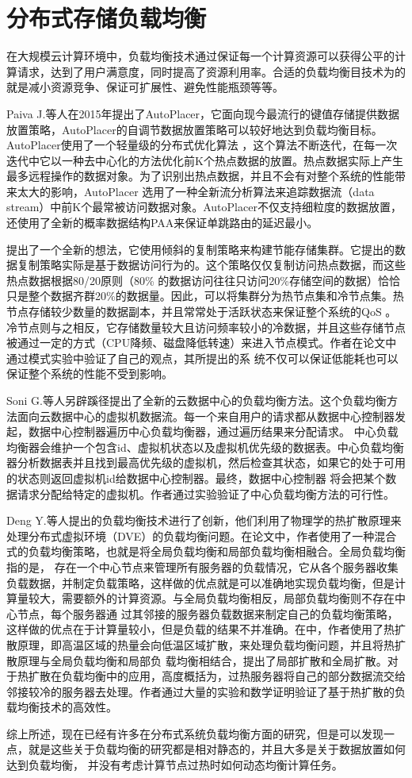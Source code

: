 \section{分布式存储负载均衡}
在大规模云计算环境中，负载均衡技术通过保证每一个计算资源可以获得公平的计算请求，达到了用户满意度，同时提高了资源利用率。合适的负载均衡目技术为的就是减小资源竞争、保证可扩展性、避免性能瓶颈等等。

Paiva J.等人在2015年提出了AutoPlacer\cite{paiva2015uto}，它面向现今最流行的键值存储提供数据放置策略，AutoPlacer的自调节数据放置策略可以较好地达到负载均衡目标。AutoPlacer使用了一个轻量级的分布式优化算法
，这个算法不断迭代，在每一次迭代中它以一种去中心化的方法优化前K个热点数据的放置。热点数据实际上产生最多远程操作的数据对象。为了识别出热点数据，并且不会有对整个系统的性能带来太大的影响，AutoPlacer
选用了一种全新流分析算法来追踪数据流（data stream）中前K个最常被访问数据对象。AutoPlacer不仅支持细粒度的数据放置，还使用了全新的概率数据结构PAA来保证单跳路由的延迟最小。


提出了一个全新的想法，它使用倾斜的复制策略来构建节能存储集群。它提出的数据复制策略实际是基于数据访问行为的。这个策略仅仅复制访问热点数据，而这些热点数据根据80/20原则（80\%
的数据访问往往只访问20\%存储空间的数据）恰恰只是整个数据齐群20\%的数据量。因此，可以将集群分为热节点集和冷节点集。热节点存储较少数量的数据副本，并且常常处于活跃状态来保证整个系统的QoS
。冷节点则与之相反，它存储数量较大且访问频率较小的冷数据，并且这些存储节点被通过一定的方式（CPU降频、磁盘降低转速）来进入节点模式。作者在论文中通过模式实验中验证了自己的观点，其所提出的系
统不仅可以保证低能耗也可以保证整个系统的性能不受到影响。

Soni G.等人另辟蹊径提出了全新的云数据中心的负载均衡方法\cite{soni2014novel}。这个负载均衡方法面向云数据中心的虚拟机数据流。每一个来自用户的请求都从数据中心控制器发起，数据中心控制器遍历中心负载均衡器，通过遍历结果来分配请求。
中心负载均衡器会维护一个包含id、虚拟机状态以及虚拟机优先级的数据表。中心负载均衡器分析数据表并且找到最高优先级的虚拟机，然后检查其状态，如果它的处于可用的状态则返回虚拟机id给数据中心控制器。最终，数据中心控制器
将会把某个数据请求分配给特定的虚拟机。作者通过实验验证了中心负载均衡方法的可行性。

Deng Y.等人提出的负载均衡技术\cite{deng2014dynamic}进行了创新，他们利用了物理学的热扩散原理来处理分布式虚拟环境（DVE）的负载均衡问题。在论文中，作者使用了一种混合式的负载均衡策略，也就是将全局负载均衡和局部负载均衡相融合。全局负载均衡指的是，
存在一个中心节点来管理所有服务器的负载情况，它从各个服务器收集负载数据，并制定负载策略，这样做的优点就是可以准确地实现负载均衡，但是计算量较大，需要额外的计算资源。与全局负载均衡相反，局部负载均衡则不存在中心节点，每个服务器通
过其邻接的服务器负载数据来制定自己的负载均衡策略，这样做的优点在于计算量较小，但是负载的结果不并准确。在中，作者使用了热扩散原理，即高温区域的热量会向低温区域扩散，来处理负载均衡问题，并且将热扩散原理与全局负载均衡和局部负
载均衡相结合，提出了局部扩散和全局扩散。对于热扩散在负载均衡中的应用，高度概括为，过热服务器将自己的部分数据流交给邻接较冷的服务器去处理。作者通过大量的实验和数学证明验证了基于热扩散的负载均衡技术的高效性。


综上所述，现在已经有许多在分布式系统负载均衡方面的研究，但是可以发现一点，就是这些关于负载均衡的研究都是相对静态的，并且大多是关于数据放置如何达到负载均衡，
并没有考虑计算节点过热时如何动态均衡计算任务。


